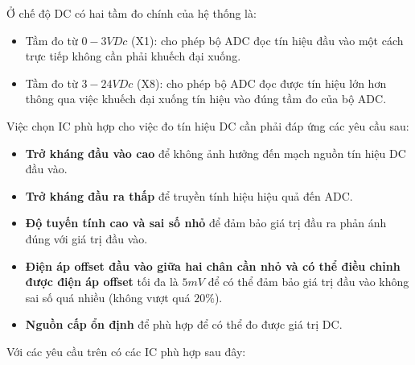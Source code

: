 	Ở chế độ DC có hai tầm đo chính của hệ thống là:
	
	\begin{itemize}[label=-]
		\item Tầm đo từ $0 - 3VDc$ (X1): cho phép bộ ADC đọc tín hiệu đầu vào một cách trực tiếp không cần phải khuếch đại xuống.
		\item Tầm đo từ $3 - 24VDc$ (X8): cho phép bộ ADC đọc được tín hiệu lớn hơn thông qua việc khuếch đại xuống tín hiệu vào đúng tầm đo của bộ ADC.
	\end{itemize}
	
	Việc chọn IC phù hợp cho việc đo tín hiệu DC cần phải đáp ứng các yêu cầu sau:
	
	\begin{itemize}[label = -]
		\item \textbf{Trở kháng đầu vào cao} để không ảnh hưởng đến mạch nguồn tín hiệu DC đầu vào.
		\item \textbf{Trở kháng đầu ra thấp} để truyền tính hiệu hiệu quả đến ADC.
		\item \textbf{Độ tuyến tính cao và sai số nhỏ} để đảm bảo giá trị đầu ra phản ánh đúng với giá trị đầu vào.
		\item \textbf{Điện áp offset đầu vào giữa hai chân cần nhỏ và có thể điều chỉnh được điện áp offset} tối đa là $5mV$ để có thể đảm bảo giá trị đầu vào không sai số quá nhiều (không vượt quá $20\%$).
		\item \textbf{Nguồn cấp ổn định} để phù hợp để có thể đo được giá trị DC.
	\end{itemize}
	
	Với các yêu cầu trên có các IC phù hợp sau đây:
	

